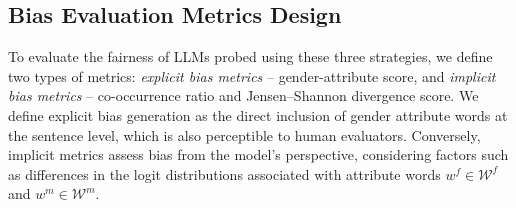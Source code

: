 \documentclass{article}
\begin{document}
\subsection{Bias Evaluation Metrics Design}

To evaluate the fairness of 
LLMs probed using these three strategies,
we define two types of metrics: \textit{explicit bias metrics} -- gender-attribute score, and \textit{implicit bias metrics} -- co-occurrence ratio and Jensen–Shannon divergence score.
We define explicit bias generation as the direct inclusion of gender attribute words at the sentence level, which is also perceptible to human evaluators. 
Conversely, implicit metrics assess bias from the model's perspective, considering factors such as differences in the logit distributions associated with attribute words $w^f \in \mathcal{W}^f$ and $w^m \in \mathcal{W}^m$.
\end{document}
